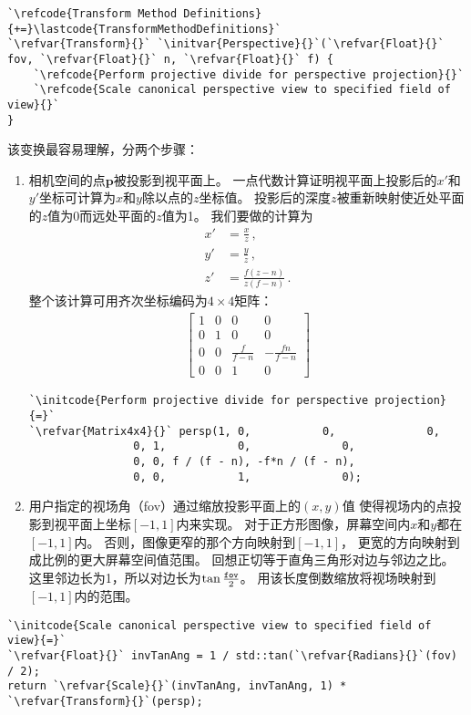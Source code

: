 \begin{lstlisting}
`\refcode{Transform Method Definitions}{+=}\lastcode{TransformMethodDefinitions}`
`\refvar{Transform}{}` `\initvar{Perspective}{}`(`\refvar{Float}{}` fov, `\refvar{Float}{}` n, `\refvar{Float}{}` f) {
    `\refcode{Perform projective divide for perspective projection}{}`
    `\refcode{Scale canonical perspective view to specified field of view}{}`
}
\end{lstlisting}
该变换最容易理解，分两个步骤：
\begin{enumerate}
    \item 相机空间的点$\bm p$被投影到视平面上。
          一点代数计算证明视平面上投影后的$x'$和$y'$坐标可计算为$x$和$y$除以点的$z$坐标值。
          投影后的深度$z$被重新映射使近处平面的$z$值为0而远处平面的$z$值为1。
          我们要做的计算为
          \begin{align*}
              x' & =\frac{x}{z}\, ,           \\
              y' & =\frac{y}{z}\, ,           \\
              z' & =\frac{f(z-n)}{z(f-n)}\, .
          \end{align*}
          整个该计算可用齐次坐标编码为$4\times4$矩阵：
          \begin{align*}
              \left[\begin{array}{cccc}
                      1 & 0 & 0             & 0               \\
                      0 & 1 & 0             & 0               \\
                      0 & 0 & \frac{f}{f-n} & -\frac{fn}{f-n} \\
                      0 & 0 & 1             & 0
                  \end{array}\right]
          \end{align*}
          \begin{lstlisting}
`\initcode{Perform projective divide for perspective projection}{=}`
`\refvar{Matrix4x4}{}` persp(1, 0,           0,              0,
                0, 1,           0,              0,
                0, 0, f / (f - n), -f*n / (f - n),
                0, 0,           1,              0);
\end{lstlisting}
    \item 用户指定的视场角（{\ttfamily fov}）通过缩放投影平面上的$(x,y)$值
          使得视场内的点投影到视平面上坐标$[-1,1]$内来实现。
          对于正方形图像，屏幕空间内$x$和$y$都在$[-1,1]$内。
          否则，图像更窄的那个方向映射到$[-1,1]$，
          更宽的方向映射到成比例的更大屏幕空间值范围。
          回想正切等于直角三角形对边与邻边之比。
          这里邻边长为1，所以对边长为$\tan\frac{\text{\ttfamily fov}}{2}$。
          用该长度倒数缩放将视场映射到$[-1,1]$内的范围。
\end{enumerate}
\begin{lstlisting}
`\initcode{Scale canonical perspective view to specified field of view}{=}`
`\refvar{Float}{}` invTanAng = 1 / std::tan(`\refvar{Radians}{}`(fov) / 2);
return `\refvar{Scale}{}`(invTanAng, invTanAng, 1) * `\refvar{Transform}{}`(persp);
\end{lstlisting}

